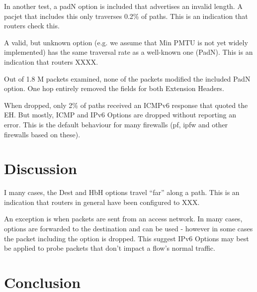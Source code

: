\documentclass[conference]{IEEEtran}
\begin{document}
 In another test, a padN option is included that advertises an invalid length. A pacjet that includes this only traverses 0.2\% of paths. This is an indication that routers check this.
 
A valid, but unknown option (e.g. we assume that Min PMTU is not yet widely implemented) has the same traversal rate as a well-known one (PadN).
This is an indication that routers  XXXX.

Out of 1.8 M packets examined, none of the packets modified the included PadN option.
One hop entirely removed the fields for both Extension Headers.

When dropped, only 2\% of paths received an ICMPv6 response that quoted the EH.
But mostly, ICMP and IPv6 Options are dropped without reporting an error. This is the default behaviour for many firewalls (pf, ipfw and other firewalls based on these).
%

\section{Discussion} 
\label{sec:discussion}

I many cases, the Dest and HbH options travel “far” along a path. This is an indication that routers in general have been configured to XXX.

An exception is when packets are sent from an access network.
In many cases, options are forwarded to the destination and can be used - however in some cases the packet including the option is dropped.
This suggest IPv6 Options may best be applied to probe packets that don’t impact a flow’s normal traffic.

\section{Conclusion}
\label{sec:conclusion}


\small

\end{document}
